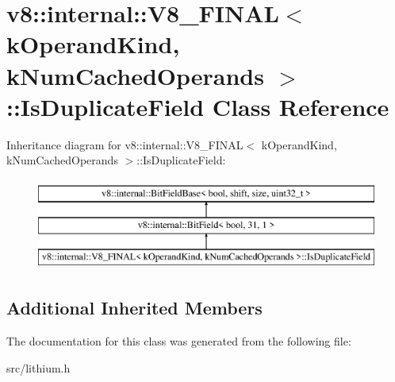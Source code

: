 \hypertarget{classv8_1_1internal_1_1_v8___f_i_n_a_l_1_1_is_duplicate_field}{}\section{v8\+:\+:internal\+:\+:V8\+\_\+\+F\+I\+N\+A\+L$<$ k\+Operand\+Kind, k\+Num\+Cached\+Operands $>$\+:\+:Is\+Duplicate\+Field Class Reference}
\label{classv8_1_1internal_1_1_v8___f_i_n_a_l_1_1_is_duplicate_field}
Inheritance diagram for v8\+:\+:internal\+:\+:V8\+\_\+\+F\+I\+N\+A\+L$<$ k\+Operand\+Kind, k\+Num\+Cached\+Operands $>$\+:\+:Is\+Duplicate\+Field\+:\begin{figure}[H]
\begin{center}
\leavevmode
\includegraphics[height=3.000000cm]{classv8_1_1internal_1_1_v8___f_i_n_a_l_1_1_is_duplicate_field}
\end{center}
\end{figure}
\subsection*{Additional Inherited Members}


The documentation for this class was generated from the following file\+:\begin{DoxyCompactItemize}
\item 
src/lithium.\+h\end{DoxyCompactItemize}
